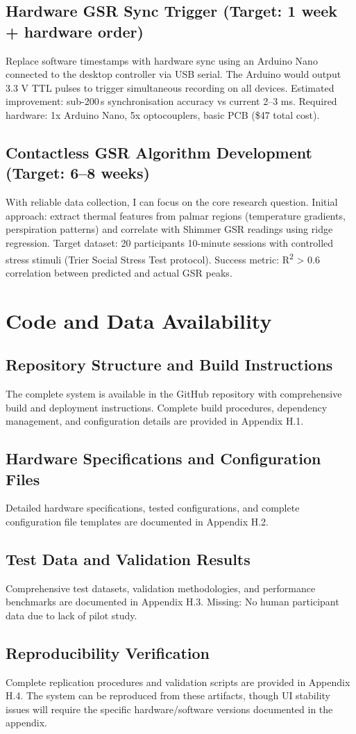 \subsection{Hardware GSR Sync Trigger (Target: 1 week + hardware order)}
Replace software timestamps with hardware sync using an Arduino Nano connected to the desktop controller via USB serial. The Arduino would output 3.3 V TTL pulses to trigger simultaneous recording on all devices. Estimated improvement: sub-200\,\textmu s synchronisation accuracy vs current 2--3 ms. Required hardware: 1x Arduino Nano, 5x optocouplers, basic PCB (\$47 total cost).

\subsection{Contactless GSR Algorithm Development (Target: 6--8 weeks)}
With reliable data collection, I can focus on the core research question. Initial approach: extract thermal features from palmar regions (temperature gradients, perspiration patterns) and correlate with Shimmer GSR readings using ridge regression. Target dataset: 20 participants \texttimes{} 10-minute sessions with controlled stress stimuli (Trier Social Stress Test protocol). Success metric: R\textsuperscript{2} \textgreater{} 0.6 correlation between predicted and actual GSR peaks.


\section{Code and Data Availability}

\subsection{Repository Structure and Build Instructions}
The complete system is available in the GitHub repository with comprehensive build and deployment instructions. Complete build procedures, dependency management, and configuration details are provided in Appendix H.1.

\subsection{Hardware Specifications and Configuration Files}
Detailed hardware specifications, tested configurations, and complete configuration file templates are documented in Appendix H.2.

\subsection{Test Data and Validation Results}
Comprehensive test datasets, validation methodologies, and performance benchmarks are documented in Appendix H.3. Missing: No human participant data due to lack of pilot study.

\subsection{Reproducibility Verification}
Complete replication procedures and validation scripts are provided in Appendix H.4. The system can be reproduced from these artifacts, though UI stability issues will require the specific hardware/software versions documented in the appendix.
